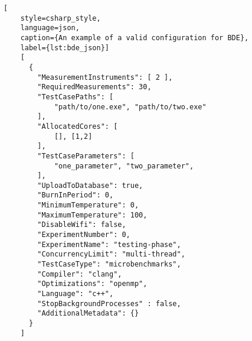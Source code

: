 
\begin{lstlisting}[
    style=csharp_style,
    language=json, 
    caption={An example of a valid configuration for BDE},
    label={lst:bde_json}]
    [
      {
        "MeasurementInstruments": [ 2 ],
        "RequiredMeasurements": 30,
        "TestCasePaths": [
            "path/to/one.exe", "path/to/two.exe" 
        ],
        "AllocatedCores": [
            [], [1,2]
        ],
        "TestCaseParameters": [ 
            "one_parameter", "two_parameter",
        ],
        "UploadToDatabase": true,
        "BurnInPeriod": 0,
        "MinimumTemperature": 0,
        "MaximumTemperature": 100,
        "DisableWifi": false,
        "ExperimentNumber": 0,
        "ExperimentName": "testing-phase",
        "ConcurrencyLimit": "multi-thread",
        "TestCaseType": "microbenchmarks",
        "Compiler": "clang",
        "Optimizations": "openmp",
        "Language": "c++",
        "StopBackgroundProcesses" : false,
        "AdditionalMetadata": {}
      }
    ]

\end{lstlisting}